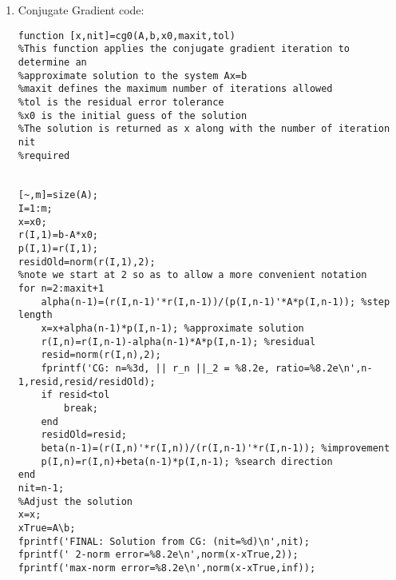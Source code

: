 \documentclass[12pt]{article}
\numberwithin{equation}{section}
\begin{document}
\begin{enumerate}
\begin{lstlisting}
%form b
b=zeros(m,1);
for i=1:m
    b(i)=1+i/m;
end
\end{lstlisting}

Results:

\begin{lstlisting}
>> [x,nit]=gmres0(A,b,b,30,10^(-5))
GMRES: n=  1, ||r_n||_2 = 9.15e+01, ratio=9.15e+01
GMRES: n=  2, ||r_n||_2 = 5.88e-01, ratio=6.43e-03
GMRES: n=  3, ||r_n||_2 = 2.59e-01, ratio=4.40e-01
GMRES: n=  4, ||r_n||_2 = 1.39e-01, ratio=5.35e-01
GMRES: n=  5, ||r_n||_2 = 7.86e-02, ratio=5.68e-01
GMRES: n=  6, ||r_n||_2 = 4.56e-02, ratio=5.79e-01
GMRES: n=  7, ||r_n||_2 = 2.66e-02, ratio=5.84e-01
GMRES: n=  8, ||r_n||_2 = 1.55e-02, ratio=5.85e-01
GMRES: n=  9, ||r_n||_2 = 9.10e-03, ratio=5.86e-01
GMRES: n= 10, ||r_n||_2 = 5.33e-03, ratio=5.86e-01
GMRES: n= 11, ||r_n||_2 = 3.12e-03, ratio=5.86e-01
GMRES: n= 12, ||r_n||_2 = 1.83e-03, ratio=5.86e-01
GMRES: n= 13, ||r_n||_2 = 1.07e-03, ratio=5.86e-01
GMRES: n= 14, ||r_n||_2 = 6.28e-04, ratio=5.86e-01
GMRES: n= 15, ||r_n||_2 = 3.68e-04, ratio=5.86e-01
GMRES: n= 16, ||r_n||_2 = 2.15e-04, ratio=5.86e-01
GMRES: n= 17, ||r_n||_2 = 1.26e-04, ratio=5.86e-01
GMRES: n= 18, ||r_n||_2 = 7.39e-05, ratio=5.86e-01
GMRES: n= 19, ||r_n||_2 = 4.33e-05, ratio=5.86e-01
GMRES: n= 20, ||r_n||_2 = 2.54e-05, ratio=5.86e-01
GMRES: n= 21, ||r_n||_2 = 1.49e-05, ratio=5.86e-01
FINAL: Solution from GMRES: (nit=22)
 2-norm error=6.06e-06
max-norm error=3.79e-06
    \end{lstlisting}

\item Conjugate Gradient code:

\begin{lstlisting}
function [x,nit]=cg0(A,b,x0,maxit,tol)
%This function applies the conjugate gradient iteration to determine an
%approximate solution to the system Ax=b
%maxit defines the maximum number of iterations allowed
%tol is the residual error tolerance
%x0 is the initial guess of the solution
%The solution is returned as x along with the number of iteration nit
%required


[~,m]=size(A);
I=1:m;
x=x0;
r(I,1)=b-A*x0;
p(I,1)=r(I,1);
residOld=norm(r(I,1),2);
%note we start at 2 so as to allow a more convenient notation
for n=2:maxit+1
    alpha(n-1)=(r(I,n-1)'*r(I,n-1))/(p(I,n-1)'*A*p(I,n-1)); %step length
    x=x+alpha(n-1)*p(I,n-1); %approximate solution
    r(I,n)=r(I,n-1)-alpha(n-1)*A*p(I,n-1); %residual
    resid=norm(r(I,n),2);
    fprintf('CG: n=%3d, || r_n ||_2 = %8.2e, ratio=%8.2e\n',n-1,resid,resid/residOld);
    if resid<tol
        break;
    end
    residOld=resid;
    beta(n-1)=(r(I,n)'*r(I,n))/(r(I,n-1)'*r(I,n-1)); %improvement
    p(I,n)=r(I,n)+beta(n-1)*p(I,n-1); %search direction
end
nit=n-1;
%Adjust the solution
x=x;
xTrue=A\b;
fprintf('FINAL: Solution from CG: (nit=%d)\n',nit);
fprintf(' 2-norm error=%8.2e\n',norm(x-xTrue,2));
fprintf('max-norm error=%8.2e\n',norm(x-xTrue,inf));
\end{lstlisting}


\end{enumerate}
\end{document}
